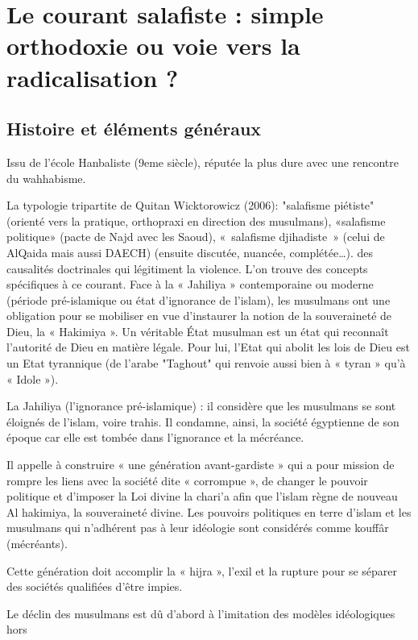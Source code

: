 \section{Le courant salafiste : simple orthodoxie ou voie vers la radicalisation ?}

\subsection{Histoire et éléments généraux}

Issu de l'école Hanbaliste (9eme siècle), réputée la plus dure avec une rencontre du wahhabisme.

La typologie tripartite de Quitan Wicktorowicz (2006): "salafisme piétiste" (orienté vers la pratique, orthopraxi en direction des musulmans), «salafisme politique» (pacte de Najd avec les Saoud), « salafisme djihadiste » (celui de AlQaida mais aussi DAECH) (ensuite discutée, nuancée, complétée…). des causalités doctrinales qui légitiment la violence.
L'on trouve des concepts spécifiques à ce courant. Face à la « Jahiliya » contemporaine ou moderne (période pré-islamique ou état d'ignorance
de l'islam), les musulmans ont une obligation pour se mobiliser en vue
d’instaurer la notion de la souveraineté de Dieu, la « Hakimiya ». Un véritable État musulman est un état qui reconnaît l'autorité de Dieu en matière
légale. Pour lui, l’Etat qui abolit les lois de Dieu est un Etat tyrannique (de l'arabe "Taghout"
qui renvoie aussi bien à « tyran » qu'à « Idole »).  
\bi 
\item  La Jahiliya (l’ignorance pré-islamique) : il considère que les musulmans se sont éloignés
de l’islam, voire trahis. Il condamne, ainsi, la société égyptienne de son époque car elle
est tombée dans l’ignorance et la mécréance.
\item  Il appelle à construire « une génération avant-gardiste » qui a pour mission de rompre
les liens avec la société dite « corrompue », de changer le pouvoir politique et
d’imposer la Loi divine la chari’a afin que l’islam règne de nouveau Al hakimiya, la
souveraineté divine. Les pouvoirs politiques en terre d’islam et les musulmans qui
n’adhérent pas à leur idéologie sont considérés comme kouffâr (mécréants).
\item  Cette génération doit accomplir la « hijra », l’exil et la rupture pour se séparer des
sociétés qualifiées d’être impies.
\item  Le déclin des musulmans est dû d’abord à l’imitation des modèles idéologiques hors
